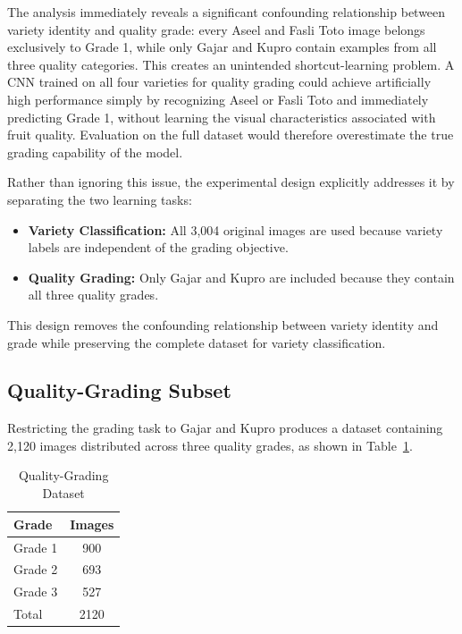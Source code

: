 \documentclass[conference]{IEEEtran}
\begin{document}
The analysis immediately reveals a significant confounding relationship between variety identity and quality grade: every Aseel and Fasli Toto image belongs exclusively to Grade 1, while only Gajar and Kupro contain examples from all three quality categories. This creates an unintended shortcut-learning problem. A CNN trained on all four varieties for quality grading could achieve artificially high performance simply by recognizing Aseel or Fasli Toto and immediately predicting Grade 1, without learning the visual characteristics associated with fruit quality. Evaluation on the full dataset would therefore overestimate the true grading capability of the model.

Rather than ignoring this issue, the experimental design explicitly addresses it by separating the two learning tasks:
\begin{itemize}
\item \textbf{Variety Classification:} All 3{,}004 original images are used because variety labels are independent of the grading objective.
\item \textbf{Quality Grading:} Only Gajar and Kupro are included because they contain all three quality grades.
\end{itemize}
This design removes the confounding relationship between variety identity and grade while preserving the complete dataset for variety classification.

\subsection{Quality-Grading Subset}
Restricting the grading task to Gajar and Kupro produces a dataset containing 2{,}120 images distributed across three quality grades, as shown in Table~\ref{tab:grade_subset}.

\begin{table}[htbp]
\caption{Quality-Grading Dataset}
\begin{center}
\begin{tabular}{lc}
\toprule
\textbf{Grade} & \textbf{Images} \\
\midrule
Grade 1 & 900 \\
Grade 2 & 693 \\
Grade 3 & 527 \\
\midrule
Total & 2120 \\
\bottomrule
\end{tabular}
\label{tab:grade_subset}
\end{center}
\end{table}
\end{document}
